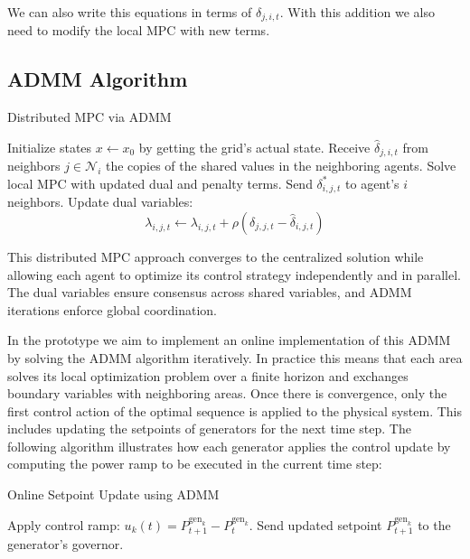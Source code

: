 \documentclass{article}
\begin{document}
We can also write this equations in terms of $\delta_{j,i,t}$. With this addition we also need to modify the local MPC with new terms. 

\subsection{ADMM Algorithm}

\begin{algorithm}[H]
\caption{Distributed MPC via ADMM}
\begin{algorithmic}[1]
    \State Initialize states $x \gets x_0$ by getting the grid's actual state.
            \State Receive $\hat{\delta}_{j,i,t}$ from neighbors $j \in \mathcal{N}_i$ the copies of the shared values in the neighboring agents.
            \State Solve local MPC with updated dual and penalty terms.
            \State Send $\delta^*_{i,j,t}$ to agent's $i$ neighbors. 
        \EndFor
            \State Update dual variables:
            \[
                \lambda_{i,j,t} \gets \lambda_{i,j,t} + \rho (\delta_{j,j,t} - \hat{\delta}_{i,j,t})
            \]
        \EndFor
    \EndWhile
\end{algorithmic}
\end{algorithm}

This distributed MPC approach converges to the centralized solution while allowing each agent to optimize its control strategy independently and in parallel. The dual variables ensure consensus across shared variables, and ADMM iterations enforce global coordination. 

In the prototype we aim to implement an online implementation of this ADMM by solving the ADMM algorithm iteratively. In practice this means that each area solves its local optimization problem over a finite horizon and exchanges boundary variables  with neighboring areas. Once there is convergence, only the first control action of the optimal sequence is applied to the physical system. This includes updating the setpoints of generators for the next time step. The following algorithm illustrates how each generator applies the control update by computing the power ramp to be executed in the current time step:

\begin{algorithm}
\caption{Online Setpoint Update using ADMM}
\begin{algorithmic}
        \State Apply control ramp: $u_k(t) = P^{\text{gen}_k}_{t+1} - P^{\text{gen}_k}_t$.
        \State Send updated setpoint $P^{\text{gen}_k}_{t+1}$ to the generator's governor.
    \EndFor
\end{algorithmic}
\end{algorithm}
\end{document}
